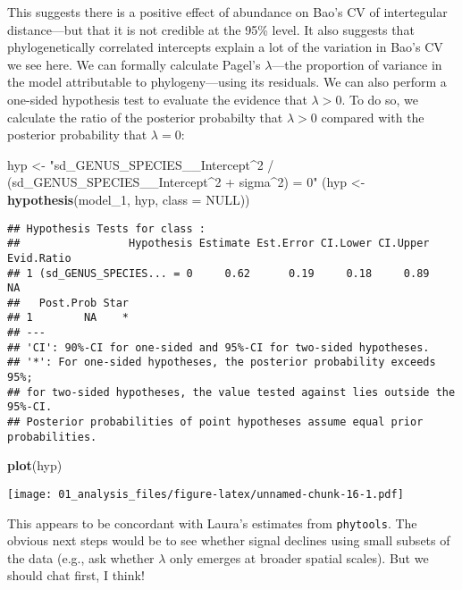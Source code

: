 \documentclass[
]{article}
\newenvironment{Shaded}{\begin{snugshade}}{\end{snugshade}}
\newcommand{\AttributeTok}[1]{\textcolor[rgb]{0.13,0.29,0.53}{#1}}
\newcommand{\ConstantTok}[1]{\textcolor[rgb]{0.56,0.35,0.01}{#1}}
\newcommand{\FunctionTok}[1]{\textcolor[rgb]{0.13,0.29,0.53}{\textbf{#1}}}
\newcommand{\NormalTok}[1]{#1}
\newcommand{\OtherTok}[1]{\textcolor[rgb]{0.56,0.35,0.01}{#1}}
\newcommand{\StringTok}[1]{\textcolor[rgb]{0.31,0.60,0.02}{#1}}
\begin{document}
This suggests there is a positive effect of abundance on Bao's CV of
intertegular distance---but that it is not credible at the 95\% level.
It also suggests that phylogenetically correlated intercepts explain a
lot of the variation in Bao's CV we see here. We can formally calculate
Pagel's \(\lambda\)---the proportion of variance in the model
attributable to phylogeny---using its residuals. We can also perform a
one-sided hypothesis test to evaluate the evidence that \(\lambda > 0\).
To do so, we calculate the ratio of the posterior probabilty that
\(\lambda>0\) compared with the posterior probability that
\(\lambda=0\):

\begin{Shaded}
\begin{Highlighting}[]
\NormalTok{hyp }\OtherTok{\textless{}{-}} \StringTok{"sd\_GENUS\_SPECIES\_\_Intercept\^{}2 / (sd\_GENUS\_SPECIES\_\_Intercept\^{}2 + sigma\^{}2) = 0"}
\NormalTok{(hyp }\OtherTok{\textless{}{-}} \FunctionTok{hypothesis}\NormalTok{(model\_1, hyp, }\AttributeTok{class =} \ConstantTok{NULL}\NormalTok{))}
\end{Highlighting}
\end{Shaded}

\begin{verbatim}
## Hypothesis Tests for class :
##                 Hypothesis Estimate Est.Error CI.Lower CI.Upper Evid.Ratio
## 1 (sd_GENUS_SPECIES... = 0     0.62      0.19     0.18     0.89         NA
##   Post.Prob Star
## 1        NA    *
## ---
## 'CI': 90%-CI for one-sided and 95%-CI for two-sided hypotheses.
## '*': For one-sided hypotheses, the posterior probability exceeds 95%;
## for two-sided hypotheses, the value tested against lies outside the 95%-CI.
## Posterior probabilities of point hypotheses assume equal prior probabilities.
\end{verbatim}

\begin{Shaded}
\begin{Highlighting}[]
\FunctionTok{plot}\NormalTok{(hyp)}
\end{Highlighting}
\end{Shaded}

\texttt{[image: 01\_analysis\_files/figure-latex/unnamed-chunk-16-1.pdf]}

This appears to be concordant with Laura's estimates from
\texttt{phytools}. The obvious next steps would be to see whether signal
declines using small subsets of the data (e.g., ask whether \(\lambda\)
only emerges at broader spatial scales). But we should chat first, I
think!
\end{document}
